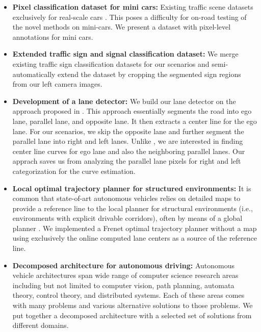 \begin{itemize}
  \item \textbf{Pixel classification dataset for mini cars:} Existing traffic
    scene datasets exclusively for real-scale cars \cite{Huang2018TheAD,
    Cordts2016TheCD, Geiger2012AreWR, Neuhold2017TheMV}. This poses a
    difficulty for on-road testing of the novel methods on mini-cars. We
    present a dataset with pixel-level annotations for mini cars.
  \item \textbf{Extended traffic sign and signal classification dataset:} We
    merge existing traffic sign classification datasets
    \cite{Timofte2009MultiviewTS, Stallkamp2012ManVC, Shakhuro2016RussianTS,
    Serna2018ClassificationOT, MaldonadoBascn2007RoadSignDA} for our scenarios
    and semi-automatically extend the dataset by cropping the segmented sign
    regions from our left camera images.
  \item \textbf{Development of a lane detector:} We build our lane detector on
    the approach proposed in \cite{Meyer2018DeepSL}. This approach essentially
    segments the road into ego lane, parallel lane, and opposite lane. It then
    extracts a center line for the ego lane. For our scenarios, we skip the
    opposite lane and further segment the parallel lane into right and left
    lanes.  Unlike \cite{Meyer2018DeepSL}, we are interested in finding center
    line curves for ego lane and also the neighboring parallel lanes. Our
    apprach saves us from analyzing the parallel lane pixels for right and left
    categorization for the curve estimation.
  \item \textbf{Local optimal trajectory planner for structured environments:}
    It is common that state-of-art autonomous vehicles relies on detailed maps
    to provide a reference line to the local planner for structural
    environments (i.e., environments with explicit drivable corridors), often
    by means of a global planner \cite{Thrun2006StanleyTR,
    Montemerlo2009JuniorTS, Kato2018AutowareOB}. We implemented a Frenet
    optimal trajectory planner \cite{Werling2010OptimalTG} without a map using
    exclusively the online computed lane centers as a source of the reference
    line.
  \item \textbf{Decomposed architecture for autonomous driving:} Autonomous
    vehicle architectures span wide range of computer science research areas
    including but not limited to computer vision, path planning, automata
    theory, control theory, and distributed systems.  Each of these areas comes
    with many problems and various alternative solutions to those problems. We
    put together a decomposed architecture with a selected set of solutions
    from different domains.
\end{itemize}


